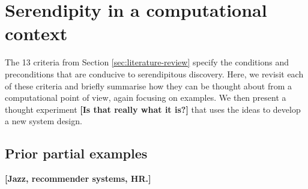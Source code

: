 \section{Serendipity in a computational context} \label{sec:computational-serendipity}

The 13 criteria from Section \ref{sec:literature-review} specify the
conditions and preconditions that are conducive to serendipitous
discovery.  Here, we revisit each of these criteria and briefly
summarise how they can be thought about from a computational point of
view, again focusing on examples.  We then present a thought
experiment \textbf{[Is that really what it is?]} that uses the ideas
to develop a new system design.

% 

\subsection{Prior partial examples}

\textbf{[Jazz, recommender systems, HR.]}
